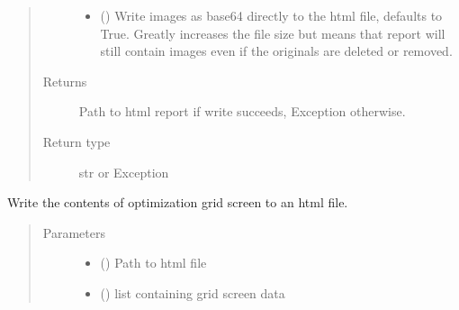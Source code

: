 \documentclass[letterpaper,10pt,english]{sphinxmanual}
\begin{document}
\begin{fulllineitems}
\begin{fulllineitems}
\begin{quote}
\begin{description}
\begin{itemize}
\item {} 
 (\sphinxstyleliteralemphasis{\sphinxupquote{, }}) \textendash{} Write images as base64 directly to the html file,
defaults to True. Greatly increases the file size
but means that report will still contain images
even if the originals are deleted or removed.

\end{itemize}

\item[{Returns}] \leavevmode
Path to html report if write succeeds, Exception otherwise.

\item[{Return type}] \leavevmode
str or Exception

\end{description}\end{quote}

\end{fulllineitems}


\begin{fulllineitems}
\label{\detokenize{polo.utils:polo.utils.io_utils.HtmlWriter.write_grid_screen}}
Write the contents of optimization grid screen to an html file.
\begin{quote}\begin{description}
\item[{Parameters}] \leavevmode\begin{itemize}
\item {} 
 () \textendash{} Path to html file

\item {} 
 () \textendash{} list containing grid screen data


\end{itemize}
\end{description}
\end{quote}
\end{fulllineitems}
\end{fulllineitems}
\end{document}
